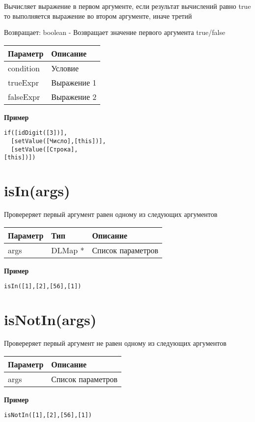 Вычисляет выражение в первом аргументе, если результат вычислений равно
true то выполняется выражение во втором аргументе, иначе третий

Возвращает: boolean - Возвращает значение первого аргумента
true/false

\begin{longtable}[]{@{}ll@{}}
\toprule
Параметр & Описание\tabularnewline
\midrule
\endhead
condition & Условие\tabularnewline
trueExpr & Выражение 1\tabularnewline
falseExpr & Выражение 2\tabularnewline
\bottomrule
\end{longtable}

\textbf{Пример}

\begin{verbatim}
if([idDigit([3])],
  [setValue([Число],[this])],
  [setValue([Строка],
[this])])
\end{verbatim}

\hypertarget{isinargs-boolean}{%
\section{isIn(args)}\label{isinargs-boolean}}

Провереряет первый аргумент равен одному из следующих аргументов


\begin{longtable}[]{@{}lll@{}}
\toprule
Параметр & Тип & Описание\tabularnewline
\midrule
\endhead
args & DLMap \textbar{} * & Список параметров\tabularnewline
\bottomrule
\end{longtable}

\textbf{Пример}

\begin{verbatim}
isIn([1],[2],[56],[1])
\end{verbatim}

\hypertarget{isnotinargs-boolean}{%
\section{isNotIn(args)}\label{isnotinargs-boolean}}

Провереряет первый аргумент не равен одному из следующих аргументов


\begin{longtable}[]{@{}ll@{}}
\toprule
Параметр & Описание\tabularnewline
\midrule
\endhead
args & Список параметров\tabularnewline
\bottomrule
\end{longtable}

\textbf{Пример}

\begin{verbatim}
isNotIn([1],[2],[56],[1])
\end{verbatim}

